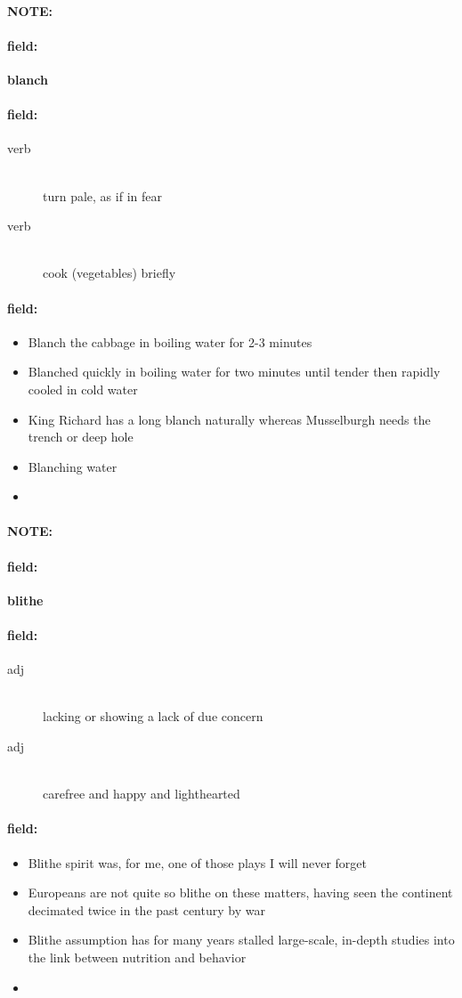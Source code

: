 \documentclass[12pt]{article}
\newenvironment{note}{\paragraph{NOTE:}}{}
\newenvironment{field}{\paragraph{field:}}{}
\begin{document}
\begin{note}
\begin{field}
\textbf{\large blanch}
\end{field}


\begin{field}
\begin{description}
\item[verb] \hfill \\ 
turn pale, as if in fear

\item[verb] \hfill \\ 
cook (vegetables) briefly

\end{description}
\end{field}

\begin{field}
\begin{itemize}
\item Blanch the cabbage in boiling water for 2-3 minutes
\item Blanched quickly in boiling water for two minutes until tender then rapidly cooled in cold water
\item King Richard has a long blanch naturally whereas Musselburgh needs the trench or deep hole
\item Blanching water
\item 
\end{itemize}
\end{field}
\end{note}
\begin{note}
\begin{field}
\textbf{\large blithe}
\end{field}


\begin{field}
\begin{description}
\item[adj] \hfill \\ 
lacking or showing a lack of due concern

\item[adj] \hfill \\ 
carefree and happy and lighthearted

\end{description}
\end{field}

\begin{field}
\begin{itemize}
\item Blithe spirit was, for me, one of those plays I will never forget
\item Europeans are not quite so blithe on these matters, having seen the continent decimated twice in the past century by war
\item Blithe assumption has for many years stalled large-scale, in-depth studies into the link between nutrition and behavior
\item 
\end{itemize}
\end{field}
\end{note}
\end{document}
